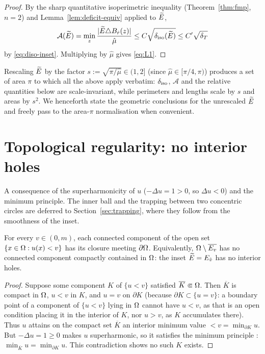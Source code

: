 \begin{proof}
By the sharp quantitative isoperimetric inequality
(Theorem~\ref{thm:fmp}, $n=2$) and Lemma~\ref{lem:deficit-equiv} applied to
$\widetilde E$,
\[
   \mathcal A(\widetilde E)=\min_z\frac{|\widetilde E\triangle B_{\hat r}(z)|}{\hat\mu}
   \le C\sqrt{\delta_{\mathrm{iso}}(\widetilde E)}\le C'\sqrt{\delta_T}
\]
by \eqref{eq:diso-inset}. Multiplying by $\hat\mu$ gives \eqref{eq:L1}.
\end{proof}

\begin{remark}[Normalisation]\label{rem:normalise}
Rescaling $\widetilde E$ by the factor $s:=\sqrt{\pi/\hat\mu}\in(1,2]$ (since
$\hat\mu\in[\pi/4,\pi)$) produces a set of area $\pi$ to which all the above
apply verbatim: $\delta_{\mathrm{iso}}$, $\mathcal A$ and the relative quantities below are
scale-invariant, while perimeters and lengths scale by $s$ and areas by
$s^2$. We henceforth state the geometric conclusions for the unrescaled
$\widetilde E$ and freely pass to the area-$\pi$ normalisation when convenient.
\end{remark}

\section{Topological regularity: no interior holes}
\label{sec:topology}

A consequence of the superharmonicity of $u$ ($-\Delta u=1>0$, so
$\Delta u<0$) and the minimum principle. The inner ball and the trapping
between two concentric circles are deferred to Section~\ref{sec:trapping},
where they follow from the smoothness of the inset.

\begin{proposition}\label{prop:noholes}
For every $v\in(0,m)$, each connected component of the open set
$\{x\in\Omega:u(x)<v\}$ has its closure meeting $\partial\Omega$. Equivalently,
$\Omega\setminus\overline{E_v}$ has no connected component compactly contained
in $\Omega$: the inset $\widetilde E=E_{\hat v}$ has no interior holes.
\end{proposition}

\begin{proof}
Suppose some component $K$ of $\{u<v\}$ satisfied $\overline K\Subset\Omega$.
Then $\overline K$ is compact in $\Omega$, $u<v$ in $K$, and $u=v$ on
$\partial K$ (because $\partial K\subset\{u=v\}$: a boundary point of a
component of $\{u<v\}$ lying in $\Omega$ cannot have $u<v$, as that is an open
condition placing it in the interior of $K$, nor $u>v$, as $K$ accumulates
there). Thus $u$ attains on the compact set $\overline K$ an interior
minimum value $<v=\min_{\partial K}u$. But $-\Delta u=1\ge0$ makes $u$
superharmonic, so it satisfies the minimum principle
\cite[Theorem~3.1 and the strong form, Theorem~3.5]{GT1983}:
$\min_{\overline K}u=\min_{\partial K}u$. This contradiction shows no such
$K$ exists.
\end{proof}
